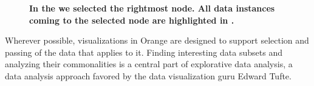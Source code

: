\begin{figure}[h]
  \caption{\textbf{\textsf{In the  we selected the rightmost node. All data instances coming to the selected node are highlighted in .}}}
\end{figure}

Wherever possible, visualizations in Orange are designed to support selection and passing of the data that applies to it. Finding interesting data subsets and analyzing their commonalities is a central part of explorative data analysis, a data analysis approach favored by the data visualization guru Edward Tufte.